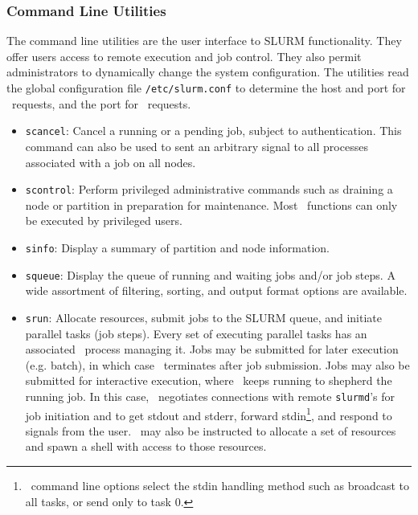 \begin{itemize}

\end{itemize}

\subsubsection{Command Line Utilities}

The command line utilities are the user interface to SLURM functionality.
They offer users access to remote execution and job control. They also 
permit administrators to dynamically change the system configuration. The 
utilities read the global configuration file {\tt /etc/slurm.conf} 
to determine the host and port for \slurmctld\ requests, and the port
for \slurmd\ requests. 

\begin{itemize}
\item {\tt scancel}: Cancel a running or a pending job, subject to
authentication. This command can also be used to sent an arbitrary 
signal to all processes associated with a job on all nodes.

\item {\tt scontrol}: Perform privileged administrative commands
such as draining a node or partition in preparation for maintenance. 
Most \scontrol\ functions can only be executed by privileged users.

\item {\tt sinfo}: Display a summary of partition and node information.

\item {\tt squeue}: Display the queue of running and waiting jobs 
and/or job steps. A wide assortment of filtering, sorting, and output 
format options are available.

\item {\tt srun}: Allocate resources, submit jobs to the SLURM queue,
and initiate parallel tasks (job steps). 
Every set of executing parallel tasks has an associated \srun\ process managing it. 
Jobs may be submitted for later execution (e.g. batch), in which case 
\srun\ terminates after job submission. 
Jobs may also be submitted for interactive execution, where \srun\ keeps 
running to shepherd the running job. In this case, 
\srun\ negotiates connections with remote {\tt slurmd}'s 
for job initiation and to
get stdout and stderr, forward stdin\footnote{\srun\ command
line options select the stdin handling method such as broadcast to all
tasks, or send only to task 0.}, and respond to signals from the user.
\srun\ may also be instructed to allocate a set of resources and
spawn a shell with access to those resources.

\end{itemize}

